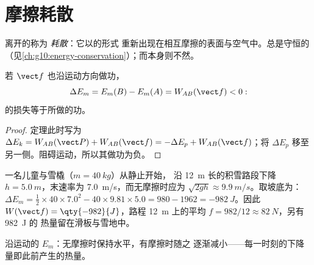 \section{摩擦耗散}

\begin{definition}[耗散]\label{def:g11:mechanical-energy:dissipation}
离开的称为
\emph{耗散}：它以的形式
重新出现在相互摩擦的表面与空气中。总是守恒的
（见\cref{ch:g10:energy-conservation}）；而本身则不然。
\end{definition}

\begin{proposition}[亏损量衡量摩擦力]\label{prop:g11:mechanical-energy:deficit}
若 $\vect f$ 也沿运动方向做功，
\[
\Delta E_m = E_m(B) - E_m(A) = W_{AB}(\vect f) < 0:
\]
的损失等于所做的功。
\end{proposition}

\begin{proof}
定理此时写为 $\Delta E_k = W_{AB}(\vect P) +
W_{AB}(\vect f) = -\Delta E_p + W_{AB}(\vect f)$；将 $\Delta E_p$
移至另一侧。阻碍运动，所以其做功为负。
\end{proof}

\begin{example}[雪橇能量核算]\label{ex:g11:mechanical-energy:toboggan}
一名儿童与雪橇（$m = \qty{40}{kg}$）从静止开始，
沿 \qty{12}{m} 长的积雪路段下降 $h = \qty{5.0}{m}$，末速率为
\qty{7.0}{m/s}，而无摩擦时应为
$\sqrt{2gh} \approx \qty{9.9}{m/s}$。取坡底为：
$\Delta E_m = \tfrac12 \times 40 \times 7.0^2 - 40 \times 9.81
\times 5.0 = 980 - 1962 = \qty{-982}{J}$。因此 $W(\vect f) =
\qty{-982}{J}$，路程 \qty{12}{m} 上的平均
$f = 982/12 \approx \qty{82}{N}$，另有 \qty{982}{J} 的
热量留在滑板与雪地中。
\end{example}

\begin{omfigure}

{\small 沿运动的 $E_m$：无摩擦时保持水平，有摩擦时随之
逐渐减小——每一时刻的下降量即此前产生的热量。}
\end{omfigure}


